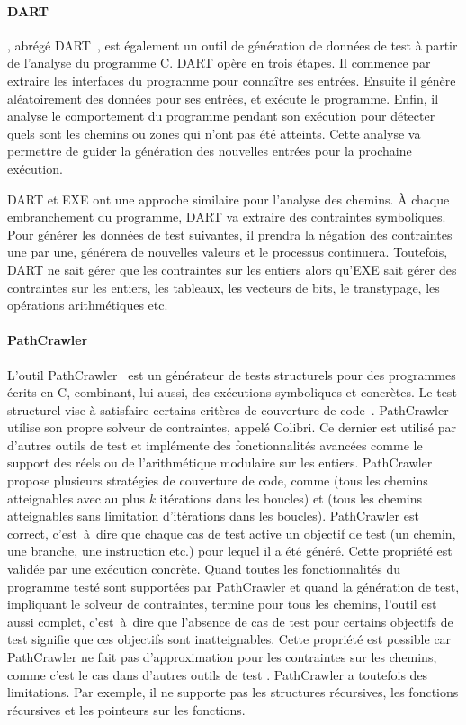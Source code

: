 \paragraph{DART} , abrégé
DART~, est également un outil de génération de données de
test à partir de l'analyse du programme C. DART opère en trois étapes. Il
commence par extraire les interfaces du programme pour connaître ses entrées.
Ensuite il génère aléatoirement des données pour ses entrées, et exécute le
programme.  Enfin, il analyse le comportement du programme pendant son exécution
pour détecter quels sont les chemins ou zones qui n'ont pas été atteints. Cette
analyse va permettre de guider la génération des nouvelles entrées pour la
prochaine exécution.

DART et EXE ont une approche similaire pour l'analyse des chemins. À chaque
embranchement du programme, DART va extraire des contraintes symboliques. Pour
générer les données de test suivantes, il prendra la négation des contraintes
une par une, générera de nouvelles valeurs et le processus continuera.
Toutefois, DART ne sait gérer que les contraintes sur les entiers alors qu'EXE
sait gérer des contraintes sur les entiers, les tableaux, les vecteurs de bits,
le transtypage, les opérations arithmétiques etc.

\paragraph{PathCrawler} L'outil PathCrawler~ est un générateur de tests structurels pour des programmes
écrits en C, combinant, lui aussi, des exécutions symboliques et concrètes. Le
test structurel vise à satisfaire certains critères de couverture de
code~.  PathCrawler utilise son propre
solveur de contraintes, appelé Colibri. Ce dernier est utilisé par d'autres
outils de test et implémente des fonctionnalités avancées comme le support des
réels ou de l'arithmétique modulaire sur les entiers. PathCrawler propose
plusieurs stratégies de couverture de code, comme 
(tous les chemins atteignables avec au plus $k$ itérations dans les boucles) et
 (tous les chemins atteignables sans limitation
d'itérations dans les boucles). PathCrawler est correct, c'est~à~dire que chaque
cas de test active un objectif de test (un chemin, une branche, une instruction
etc.) pour lequel il a été généré. Cette propriété est validée par une exécution
concrète. Quand toutes les fonctionnalités du programme testé sont supportées
par PathCrawler et quand la génération de test, impliquant le solveur de
contraintes, termine pour tous les chemins, l'outil est aussi complet,
c'est~à~dire que l'absence de cas de test pour certains objectifs de test
signifie que ces objectifs sont inatteignables. Cette propriété est possible car
PathCrawler ne fait pas d'approximation pour les contraintes sur les chemins,
comme c'est le cas dans d'autres outils de test .
PathCrawler a toutefois des limitations. Par exemple, il ne supporte pas les
structures récursives, les fonctions récursives et les pointeurs sur les
fonctions. \\

